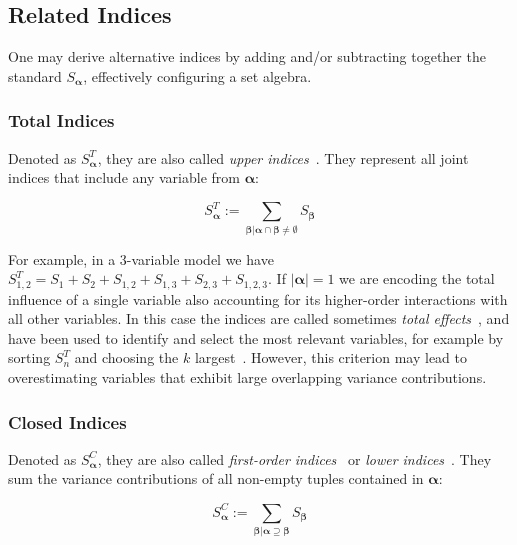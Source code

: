 \documentclass[review, twocolumn]{svjour3}          %
\begin{document}
\subsection{Related Indices} \label{sec:related_indices}

One may derive alternative indices by adding and/or subtracting together the standard $S_{\pmb{\alpha}}$, effectively configuring a set algebra.

\subsubsection{Total Indices}

Denoted as $S^T_{\pmb{\alpha}}$, they are also called \emph{upper indices}~\cite{Owen:13}. They represent all joint indices that include any variable from $\pmb{\alpha}$:

\begin{equation}
S^T_{\pmb{\alpha}} := \sum_{\pmb{\beta} | \pmb{\alpha} \cap \pmb{\beta} \ne \emptyset} S_{\pmb{\beta}}
\end{equation}

For example, in a 3-variable model we have $S^T_{1,2} = S_1 + S_2 + S_{1,2} + S_{1,3} + S_{2,3} + S_{1,2,3}$.
If $|\pmb{\alpha}| = 1$ we are encoding the total influence of a single variable also accounting for its higher-order interactions with all other variables. In this case the indices are called sometimes \emph{total effects}~\cite{HS:96}, and have been used to identify and select the most relevant variables, for example by sorting $S_n^T$ and choosing the $k$ largest~\cite{Fock:14, AJKS:17}. However, this criterion may lead to overestimating variables that exhibit large overlapping variance contributions. 

\subsubsection{Closed Indices}

Denoted as $S^C_{\pmb{\alpha}}$, they are also called \emph{first-order indices}~\cite{Sudret:08} or \emph{lower indices}~\cite{Owen:13}. They sum the variance contributions of all non-empty tuples contained in $\pmb{\alpha}$:

\begin{equation}
S^C_{\pmb{\alpha}} := \sum_{\pmb{\beta} | \pmb{\alpha} \supseteq \pmb{\beta}} S_{\pmb{\beta}}
\end{equation}
\end{document}

